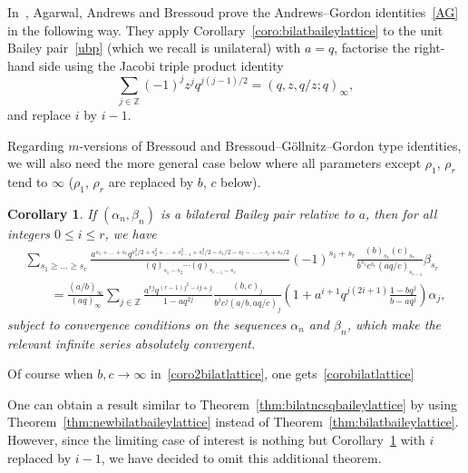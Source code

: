 \documentclass[pdftex]{sigma}
\numberwithin{equation}{section}
\newtheorem{Corollary}[Theorem]{Corollary}
\begin{document}
In~\cite{AAB}, Agarwal, Andrews and Bressoud prove the Andrews--Gordon identities~\eqref{AG} in the following way. They apply Corollary~\ref{coro:bilatbaileylattice} to the unit Bailey pair~\eqref{ubp} (which we recall is unilateral) with $a=q$, factorise the right-hand side using the Jacobi triple product identity~\cite[formula~(II.28)]{GR}
\begin{equation}\label{jtp}
\sum_{j\in\mathbb{Z}}(-1)^jz^jq^{j(j-1)/2}=(q,z,q/z;q)_\infty,
\end{equation}
and replace $i$ by $i-1$.

Regarding $m$-versions of Bressoud and Bressoud--G\"ollnitz--Gordon type identities, we will also need the more general case below where all parameters except $\rho_1$, $\rho_r$ tend to $\infty$ ($\rho_1$, $\rho_r$ are replaced by $b$, $c$ below).

\begin{Corollary}\label{coro:bilatbaileylattice2}
If $(\alpha_n, \beta_n)$ is a bilateral Bailey pair relative to $a$, then for all integers $0\leq i\leq r$, we have
\begin{gather}
\sum_{s_1\geq\dots\geq s_{r}}\frac{a^{s_1+\dots+s_r}q^{s_1^2/2+s_2^2+\dots+s_{r-1}^2+s_{r}^2/2-s_1/2-s_2-\dots-s_{i}+s_r/2}}{(q)_{s_1-s_2}\cdots(q)_{s_{r-1}-s_r}}(-1)^{s_1+s_r}\frac{(b)_{s_1}(c)_{s_r}}{b^{s_1}c^{s_r}(aq/c)_{s_{r-1}}}\beta_{s_r}\nonumber\\
\qquad=\frac{(a/b)_\infty}{(aq)_\infty}\sum_{j\in\mathbb{Z}}\frac{a^{rj}q^{(r-1)j^2-ij+j}}{1-aq^{2j}}\frac{(b,c)_j}{b^jc^j(a/b,aq/c)_j}
\left(1+a^{i+1}q^{j(2i+1)}\frac{1-bq^j}{b-aq^j}\right)\alpha_j,\label{coro2bilatlattice}
\end{gather}
subject to convergence conditions on the sequences $\alpha_n$ and $\beta_n$, which make the relevant infinite series absolutely convergent.
\end{Corollary}

Of course when $b,c\to\infty$ in~\eqref{coro2bilatlattice}, one gets~\eqref{corobilatlattice}

\begin{Remark}\label{rk:coronewbilatbaileylattice}
One can obtain a result similar to Theorem~\ref{thm:bilatncsqbaileylattice} by using Theorem~\ref{thm:newbilatbaileylattice} instead of Theorem~\ref{thm:bilatbaileylattice}. However,
since the limiting case of interest is nothing but Corollary~\ref{coro:bilatbaileylattice2} with $i$ replaced by $i-1$, we have decided to omit this additional theorem.
\end{Remark}
\end{document}
